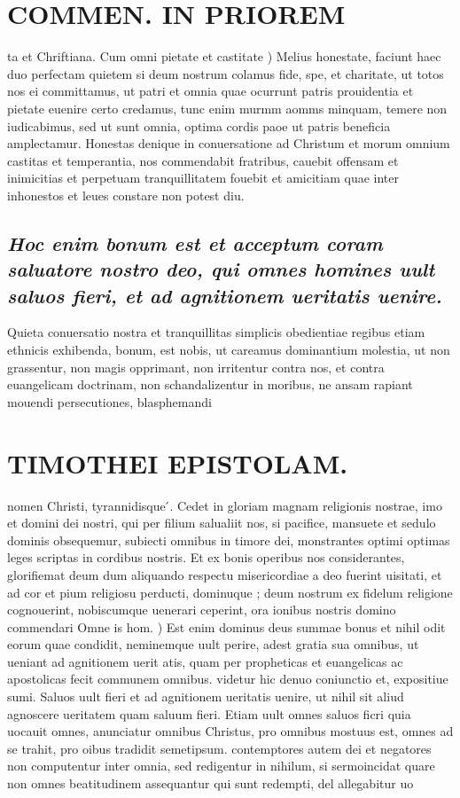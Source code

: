 \documentclass{article}
\begin{document}
\begin{pages}
\section*{COMMEN. IN PRIOREM }
\marginpar{[ p.46 ]}\pstart ta et Chriftiana.  \pend\pstart Cum omni pietate et castitate ) Melius honestate, faciunt haec duo perfectam quietem si deum nostrum colamus fide, spe, et charitate, ut totos nos ei committamus, ut patri et omnia quae ocurrunt patris prouidentia et pietate euenire certo credamus, tunc enim murmm aomms minquam, temere non iudicabimus, sed ut sunt omnia, optima cordis paoe ut patris beneficia amplectamur.  \pend\pstart Honestas denique in conuersatione ad Christum et morum omnium castitas et temperantia, nos commendabit fratribus, cauebit offensam et inimicitias et perpetuam tranquillitatem fouebit et amicitiam quae inter inhonestos et leues constare non potest diu.  \pend
{}
{}
\subsection*{\textit{Hoc enim bonum est et acceptum coram saluatore nostro deo, qui omnes homines uult saluos fieri, et ad agnitionem ueritatis uenire. }}\pstart Quieta conuersatio nostra et tranquillitas simplicis obedientiae regibus etiam ethnicis exhibenda, bonum, est nobis, ut careamus dominantium molestia, ut non grassentur, non magis opprimant, non irritentur contra nos, et contra euangelicam doctrinam, non schandalizentur in moribus, ne ansam rapiant mouendi persecutiones, blasphemandi  \pend
\section*{TIMOTHEI EPISTOLAM. }
\marginpar{[ p.47 ]}\pstart nomen Christi, tyrannidisque ́.  \pend\pstart Cedet in gloriam magnam religionis nostrae, imo et domini dei nostri, qui per filium salualiit nos, si pacifice, mansuete et sedulo dominis obsequemur, subiecti omnibus in timore dei, monstrantes optimi optimas leges scriptas in cordibus nostris. Et ex bonis operibus nos considerantes, glorifiemat deum dum aliquando respectu misericordiae a deo fuerint uisitati, et ad cor et pium religiosu perducti, dominuque ; deum nostrum ex fidelum religione cognouerint, nobiscumque uenerari ceperint, ora ionibus nostris domino commendari  \pend\pstart Omne is hom. ) Est enim dominus deus summae bonus et nihil odit eorum quae condidit, neminemque uult perire, adest gratia sua omnibus, ut ueniant ad agnitionem uerit atis, quam per propheticas et euangelicas ac apostolicas fecit communem omnibus. videtur hic denuo coniunctio et, expositiue sumi. Saluos uult fieri et ad agnitionem ueritatis uenire, ut nihil sit aliud agnoscere ueritatem quam saluum fieri. Etiam uult omnes saluos ficri quia uocauit omnes, anunciatur omnibus Christus, pro omnibus mostuus est, omnes ad se trahit, pro oibus tradidit semetipsum. contemptores autem dei et negatores non computentur inter omnia, sed redigentur in nihilum, si sermoincidat quare non omnes beatitudinem assequantur qui sunt redempti, del allegabitur uo\pend

\end{pages}
\end{document}
